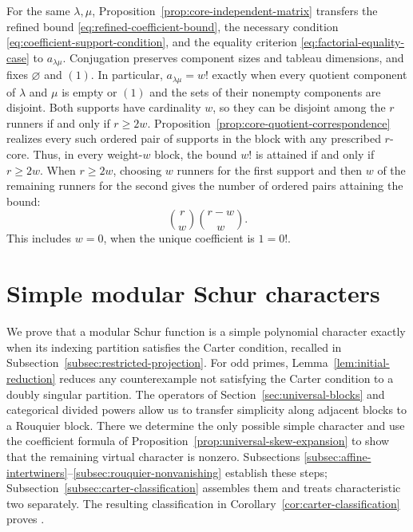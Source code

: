 \documentclass[12pt,reqno,a4paper]{amsart}
\numberwithin{equation}{section}
\numberwithin{figure}{section}
\theoremstyle{plain}
\theoremstyle{definition}
\begin{document}
For the same $\lambda,\mu$, Proposition~\ref{prop:core-independent-matrix}
transfers the refined bound \eqref{eq:refined-coefficient-bound},
the necessary condition \eqref{eq:coefficient-support-condition},
and the equality criterion \eqref{eq:factorial-equality-case} to
$a_{\lambda\mu}$. Conjugation preserves component sizes and tableau
dimensions, and fixes $\varnothing$ and $(1)$.
In particular, $a_{\lambda\mu}=w!$ exactly when every quotient
component of $\lambda$ and $\mu$ is empty or $(1)$ and the sets of
their nonempty components are disjoint.
Both supports have cardinality $w$, so they can be disjoint among
the $r$ runners if and only if $r\geq2w$.
Proposition~\ref{prop:core-quotient-correspondence} realizes every
such ordered pair of supports in the block with any prescribed
$r$-core.  Thus, in every weight-$w$ block, the bound $w!$ is
attained if and only if $r\geq2w$.  When $r\geq2w$, choosing $w$
runners for the first support and then $w$ of the remaining runners
for the second gives the number of ordered pairs attaining the bound:
\begin{equation}\label{eq:number-factorial-equality-pairs}
 \binom rw\binom{r-w}{w}.
\end{equation}
This includes $w=0$, when the
unique coefficient is $1=0!$.

\section{Simple modular Schur characters}
\label{sec:conj46}

We prove that a modular Schur function is a simple polynomial
character exactly when its indexing partition satisfies the Carter
condition, recalled in Subsection~\ref{subsec:restricted-projection}.
For odd primes, Lemma~\ref{lem:initial-reduction} reduces any
counterexample not satisfying the Carter condition to a doubly singular
partition.  The operators
of Section~\ref{sec:universal-blocks} and categorical divided powers
allow us to transfer simplicity along
adjacent blocks to a Rouquier block.  There we determine the only
possible simple character and use the coefficient formula of
Proposition~\ref{prop:universal-skew-expansion} to show that the
remaining virtual character is nonzero.  Subsections
\ref{subsec:affine-intertwiners}--\ref{subsec:rouquier-nonvanishing}
establish these steps; Subsection~\ref{subsec:carter-classification}
assembles them and treats characteristic two separately.  The resulting
classification in Corollary~\ref{cor:carter-classification} proves
\cite[Conjecture~4.6]{Walker}.
\end{document}
